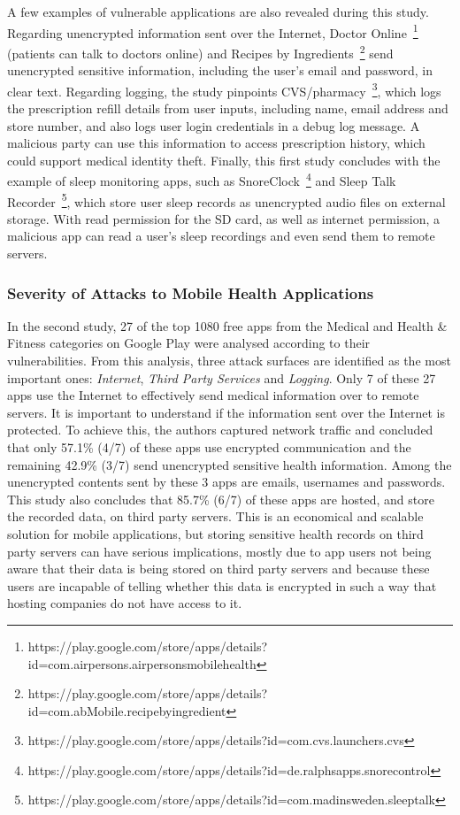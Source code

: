 A few examples of vulnerable applications are also revealed during this study. Regarding unencrypted information sent over the Internet, Doctor Online~\footnote{https://play.google.com/store/apps/details?id=com.airpersons.airpersonsmobilehealth} (patients can talk to doctors online) and Recipes by Ingredients~\footnote{https://play.google.com/store/apps/details?id=com.abMobile.recipebyingredient} send unencrypted sensitive information, including the user's email and password, in clear text. Regarding logging, the study pinpoints CVS/pharmacy~\footnote{https://play.google.com/store/apps/details?id=com.cvs.launchers.cvs}, which logs the prescription refill details from user inputs, including name, email address and store number, and also logs user login credentials in a debug log message. A malicious party can use this information to access prescription history, which could support medical identity theft. Finally, this first study concludes with the example of sleep monitoring apps, such as SnoreClock~\footnote{https://play.google.com/store/apps/details?id=de.ralphsapps.snorecontrol} and Sleep Talk Recorder~\footnote{https://play.google.com/store/apps/details?id=com.madinsweden.sleeptalk}, which store user sleep records as unencrypted audio files on external storage. With read permission for the SD card, as well as internet permission, a malicious app can read a user's sleep recordings and even send them to remote servers.

\subsubsection{Severity of Attacks to Mobile Health Applications}
In the second study, 27 of the top 1080 free apps from the Medical and Health \& Fitness categories on Google Play were analysed according to their vulnerabilities. From this analysis, three attack surfaces are identified as the most important ones: \emph{Internet}, \emph{Third Party Services} and \emph{Logging}. Only 7 of these 27 apps use the Internet to effectively send medical information over to remote servers. It is important to understand if the information sent over the Internet is protected. To achieve this, the authors captured network traffic and concluded that only 57.1\% (4/7) of these apps use encrypted communication and the remaining 42.9\% (3/7) send unencrypted sensitive health information. Among the unencrypted contents sent by these 3 apps are emails, usernames and passwords. This study also concludes that 85.7\% (6/7) of these apps are hosted, and store the recorded data, on third party servers. This is an economical and scalable solution for mobile applications, but storing sensitive health records on third party servers can have serious implications, mostly due to app users not being aware that their data is being stored on third party servers and because these users are incapable of telling whether this data is encrypted in such a way that hosting companies do not have access to it.

